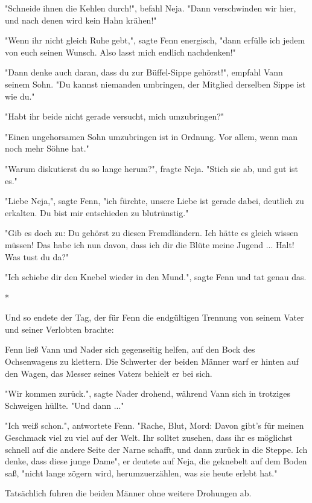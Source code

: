 \documentclass[10pt, a4paper, oneside]{book}
\begin{document}
\begin{multicols}{2}
"Schneide ihnen die Kehlen durch!", befahl Neja. "Dann verschwinden wir hier, und nach denen wird kein Hahn krähen!"

"Wenn ihr nicht gleich Ruhe gebt,", sagte Fenn energisch, "dann erfülle ich jedem von euch seinen Wunsch. Also lasst mich endlich nachdenken!"

"Dann denke auch daran, dass du zur Büffel-Sippe gehörst!", empfahl Vann seinem Sohn. "Du kannst niemanden umbringen, der Mitglied derselben Sippe ist wie du."

"Habt ihr beide nicht gerade versucht, mich umzubringen?"

"Einen ungehorsamen Sohn umzubringen ist in Ordnung. Vor allem, wenn man noch mehr Söhne hat."

"Warum diskutierst du so lange herum?", fragte Neja. "Stich sie ab, und gut ist es."

"Liebe Neja,", sagte Fenn, "ich fürchte, unsere Liebe ist gerade dabei, deutlich zu erkalten. Du bist mir entschieden zu blutrünstig."

"Gib es doch zu: Du gehörst zu diesen Fremdländern. Ich hätte es gleich wissen müssen! Das habe ich nun davon, dass ich dir die Blüte meine Jugend ... Halt! Was tust du da?"

"Ich schiebe dir den Knebel wieder in den Mund.", sagte Fenn und tat genau das.

\begin{center}
    *
\end{center}

Und so endete der Tag, der für Fenn die endgültigen Trennung von seinem Vater und seiner Verlobten brachte:

Fenn ließ Vann und Nader sich gegenseitig helfen, auf den Bock des Ochsenwagens zu klettern. Die Schwerter der beiden Männer warf er hinten auf den Wagen, das Messer seines Vaters behielt er bei sich.

"Wir kommen zurück.", sagte Nader drohend, während Vann sich in trotziges Schweigen hüllte. "Und dann ..."

"Ich weiß schon.", antwortete Fenn. "Rache, Blut, Mord: Davon gibt's für meinen Geschmack viel zu viel auf der Welt. Ihr solltet zusehen, dass ihr es möglichst schnell auf die andere Seite der Narne schafft, und dann zurück in die Steppe. Ich denke, dass diese junge Dame", er deutete auf Neja, die geknebelt auf dem Boden saß, "nicht lange zögern wird, herumzuerzählen, was sie heute erlebt hat."

Tatsächlich fuhren die beiden Männer ohne weitere Drohungen ab.


\end{multicols}
\end{document}

